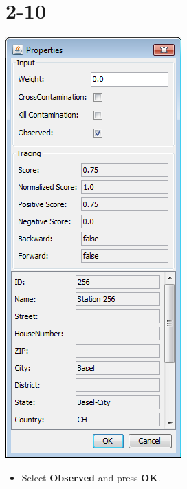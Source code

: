 \documentclass{beamer}
\begin{document}
\section{2-10}
\begin{frame}
	\begin{center}
  		\includegraphics[height=0.6\textheight]{2-10.png}
	\end{center}
	\begin{itemize}
		\item Select \textbf{Observed} and press \textbf{OK}.
	\end{itemize}
\end{frame}
\end{document}
